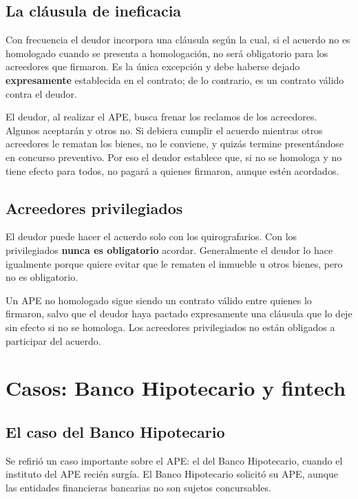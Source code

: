 \documentclass[12pt,oneside]{book}
\begin{document}
\subsection{La cláusula de ineficacia}

Con frecuencia el deudor incorpora una cláusula según la cual, si el acuerdo no es homologado cuando se presenta a homologación, no será obligatorio para los acreedores que firmaron. Es la única excepción y debe haberse dejado \textbf{expresamente} establecida en el contrato; de lo contrario, es un contrato válido contra el deudor.

\begin{note}
El deudor, al realizar el APE, busca frenar los reclamos de los acreedores. Algunos aceptarán y otros no. Si debiera cumplir el acuerdo mientras otros acreedores le rematan los bienes, no le conviene, y quizás termine presentándose en concurso preventivo. Por eso el deudor establece que, si no se homologa y no tiene efecto para todos, no pagará a quienes firmaron, aunque estén acordados.
\end{note}

\subsection{Acreedores privilegiados}

El deudor puede hacer el acuerdo solo con los quirografarios. Con los privilegiados \textbf{nunca es obligatorio} acordar. Generalmente el deudor lo hace igualmente porque quiere evitar que le rematen el inmueble u otros bienes, pero no es obligatorio.

\begin{important}
Un APE no homologado sigue siendo un contrato válido entre quienes lo firmaron, salvo que el deudor haya pactado expresamente una cláusula que lo deje sin efecto si no se homologa. Los acreedores privilegiados no están obligados a participar del acuerdo.
\end{important}

\section{Casos: Banco Hipotecario y fintech}

\subsection{El caso del Banco Hipotecario}

Se refirió un caso importante sobre el APE: el del Banco Hipotecario, cuando el instituto del APE recién surgía. %
El Banco Hipotecario solicitó su APE, aunque las entidades financieras bancarias no son sujetos concursables.
\end{document}
